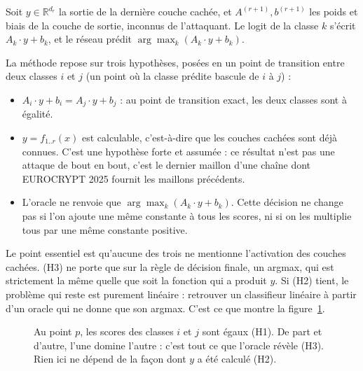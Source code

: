 \documentclass[11pt]{article}
\begin{document}
Soit $y \in \mathbb{R}^{d_r}$ la sortie de la dernière couche cachée, et
$A^{(r+1)}, b^{(r+1)}$ les poids et biais de la couche de sortie, inconnus de
l'attaquant. Le logit de la classe $k$ s'écrit $A_k \cdot y + b_k$, et le
réseau prédit $\arg\max_k (A_k \cdot y + b_k)$.

La méthode repose sur trois hypothèses, posées en un point de transition
entre deux classes $i$ et $j$ (un point où la classe prédite bascule de $i$ à
$j$) :

\begin{itemize}
  \item[\textbf{(H1)}] $A_i \cdot y + b_i = A_j \cdot y + b_j$ : au point de
    transition exact, les deux classes sont à égalité.
  \item[\textbf{(H2)}] $y = f_{1..r}(x)$ est calculable, c'est-à-dire que les
    couches cachées sont déjà connues. C'est une hypothèse forte et
    assumée : ce résultat n'est pas une attaque de bout en bout, c'est le
    dernier maillon d'une chaîne dont EUROCRYPT 2025 fournit les maillons
    précédents.
  \item[\textbf{(H3)}] L'oracle ne renvoie que $\arg\max_k(A_k \cdot y +
    b_k)$. Cette décision ne change pas si l'on ajoute une même constante à
    tous les scores, ni si on les multiplie tous par une même constante
    positive.
\end{itemize}

Le point essentiel est qu'aucune des trois ne mentionne l'activation des
couches cachées. (H3) ne porte que sur la règle de décision finale, un
argmax, qui est strictement la même quelle que soit la fonction qui a produit
$y$. Si (H2) tient, le problème qui reste est purement linéaire : retrouver
un classifieur linéaire à partir d'un oracle qui ne donne que son argmax.
C'est ce que montre la figure~\ref{fig:transition}.

\begin{figure}[h]
\centering
{}
\caption{Au point $p$, les scores des classes $i$ et $j$ sont égaux (H1).
De part et d'autre, l'une domine l'autre : c'est tout ce que l'oracle
révèle (H3). Rien ici ne dépend de la façon dont $y$ a été calculé (H2).}
\label{fig:transition}
\end{figure}
\end{document}
